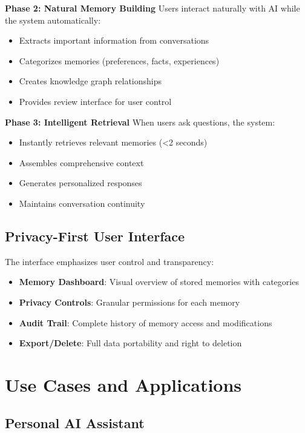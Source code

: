 \documentclass[12pt, a4paper]{article}
\begin{document}
\textbf{Phase 2: Natural Memory Building}
Users interact naturally with AI while the system automatically:
\begin{itemize}
    \item Extracts important information from conversations
    \item Categorizes memories (preferences, facts, experiences)
    \item Creates knowledge graph relationships
    \item Provides review interface for user control
\end{itemize}

\textbf{Phase 3: Intelligent Retrieval}
When users ask questions, the system:
\begin{itemize}
    \item Instantly retrieves relevant memories (<2 seconds)
    \item Assembles comprehensive context
    \item Generates personalized responses
    \item Maintains conversation continuity
\end{itemize}

\subsection{Privacy-First User Interface}

The interface emphasizes user control and transparency:

\begin{itemize}
    \item \textbf{Memory Dashboard}: Visual overview of stored memories with categories
    \item \textbf{Privacy Controls}: Granular permissions for each memory
    \item \textbf{Audit Trail}: Complete history of memory access and modifications
    \item \textbf{Export/Delete}: Full data portability and right to deletion
\end{itemize}
\newpage
\section{Use Cases and Applications}

\subsection{Personal AI Assistant}
\end{document}
